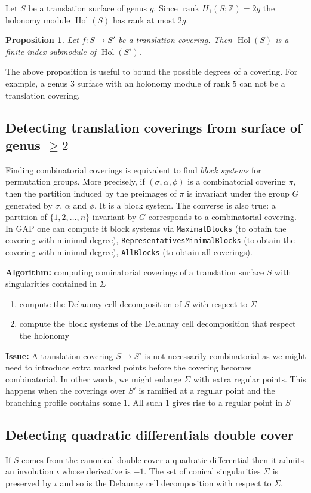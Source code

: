 \documentclass[a4paper,12pt]{article}
\def\bZ{\mathbb{Z}}
\def\Hol{\operatorname{Hol}}
\def\rank{\operatorname{rank}}
\newtheorem{proposition}[definition]{Proposition}
\begin{document}
Let $S$ be a translation surface of genus $g$. Since $\rank H_1(S; \bZ) = 2g$
the holonomy module $\Hol(S)$ has rank at most $2g$.
\begin{proposition}
Let $f: S \to S'$ be a translation covering.
Then $\Hol(S)$ is a finite index submodule of $\Hol(S')$.
\end{proposition}
The above proposition is useful to bound the possible degrees of a covering.
For example, a genus 3 surface with an holonomy module of rank $5$ can not
be a translation covering.

\subsection{Detecting translation coverings from surface of genus $\geq 2$}
Finding combinatorial coverings is equivalent to find \emph{block systems} for
permutation groups.  More precisely, if $(\sigma, \alpha, \phi)$ is a
combinatorial covering $\pi$, then the partition induced by the preimages of
$\pi$ is invariant under the group $G$ generated by $\sigma$, $\alpha$ and
$\phi$. It is a block system. The converse is also true: a partition of
$\{1,2,\ldots,n\}$ invariant by $G$ corresponds to a combinatorial covering. In
GAP one can compute it block systems via \texttt{MaximalBlocks} (to obtain the
covering with minimal degree), \texttt{RepresentativesMinimalBlocks} (to obtain
the covering with minimal degree), \texttt{AllBlocks} (to obtain all
coverings).

\textbf{Algorithm:} computing cominatorial coverings of a translation surface $S$
with singularities contained in $\Sigma$
\begin{enumerate}
\item compute the Delaunay cell decomposition of $S$ with respect to $\Sigma$
\item compute the block systems of the Delaunay cell decomposition that
respect the holonomy
\end{enumerate}

\textbf{Issue:} A translation covering $S \to S'$ is not necessarily combinatorial
as we might need to introduce extra marked points before the covering becomes
combinatorial. In other words, we might enlarge $\Sigma$ with extra regular
points. This happens when the coverings over $S'$ is ramified at a
regular point and the branching profile contains some $1$. All such $1$
gives rise to a regular point in $S$

\subsection{Detecting quadratic differentials double cover}
If $S$ comes from the canonical double cover a quadratic differential then it
admits an involution $\iota$ whose derivative is $-1$. The set of conical
singularities $\Sigma$ is preserved by $\iota$ and so is the Delaunay cell
decomposition with respect to $\Sigma$.
\end{document}
